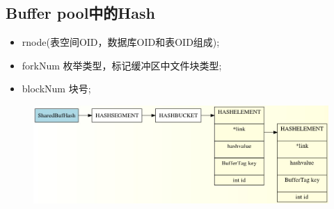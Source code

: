 \documentclass{article}
\begin{document}
\begin{CJK*}{UTF8}{gkai}
\section{Buffer pool中的Hash} 

\begin{itemize}
\item \quad rnode(表空间OID，数据库OID和表OID组成);\\
\item \quad forkNum 枚举类型，标记缓冲区中文件块类型;\\
\item \quad blockNum  块号;
\end{itemize}

\begin{figure}[H] 
\centering
\includegraphics[width = \textwidth]{buf.jpg}
\caption{}
\label{overflow}
\end{figure}



\end{CJK*}
\end{document}
